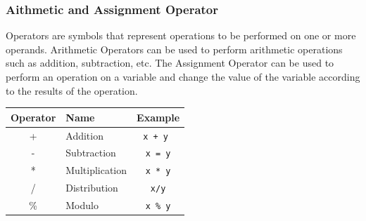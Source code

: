 \subsubsection{Aithmetic and Assignment Operator }
Operators are symbols that represent operations to be performed on one or more operands.
Arithmetic Operators can be used to perform arithmetic operations such as addition, subtraction, etc.
The Assignment Operator can be used to perform an operation on a variable and change the value of the variable according to the results of the operation.
\begin{center}
	\begin{tabular}{|c|l|c|}
		\hline

		\multicolumn{1}{|l|}{\textbf{Operator}} & \textbf{Name}  & \multicolumn{1}{l|}{\textbf{Example}} \\ \hline
		+                                       & Addition       & \verb|x + y |                         \\ \hline
		-                                       & Subtraction    & \verb|x = y|                          \\ \hline
		*                                       & Multiplication & \verb|x * y|                          \\ \hline
		/                                       & Distribution   & \verb|x/y|                            \\ \hline
		\%                                      & Modulo         & \verb|x % y|                          \\ \hline
	\end{tabular}
\end{center}

